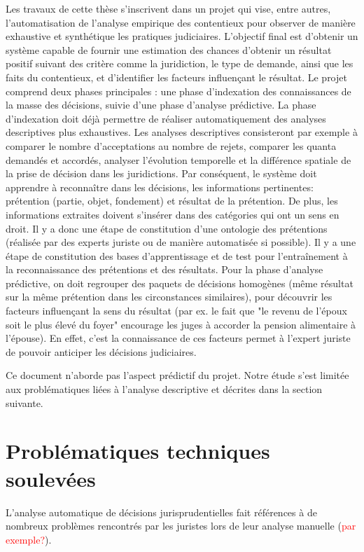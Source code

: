 Les travaux de cette thèse s'inscrivent dans un projet qui vise, entre autres, l'automatisation de l'analyse empirique des contentieux pour observer de manière exhaustive et synthétique les pratiques judiciaires. L'objectif final est d'obtenir un système capable de fournir une estimation des chances d'obtenir un résultat positif suivant des critère comme la juridiction, le type de demande, ainsi que les faits du contentieux, et d'identifier les facteurs influençant le résultat. Le projet comprend deux phases principales : une phase d'indexation des connaissances de la masse des décisions, suivie d'une phase d'analyse prédictive. La phase d'indexation doit déjà permettre de réaliser automatiquement des analyses descriptives plus exhaustives. Les analyses descriptives consisteront par exemple à comparer le nombre d'acceptations au nombre de rejets, comparer les quanta demandés et accordés, analyser l'évolution temporelle et la différence spatiale de la prise de décision dans les juridictions. Par conséquent, le système doit apprendre à reconnaître dans les décisions, les informations pertinentes: prétention (partie, objet, fondement) et résultat de la prétention. De plus, les informations extraites doivent s'insérer dans des catégories qui ont un sens en droit. Il y a donc une étape de constitution d'une ontologie des prétentions (réalisée par des experts juriste ou de manière automatisée si possible). Il y a une étape de constitution des bases d'apprentissage et de test pour l'entraînement à la reconnaissance des prétentions et des résultats.
Pour la phase d'analyse prédictive, on doit regrouper des paquets de décisions homogènes (même résultat sur la même prétention dans les circonstances similaires), pour découvrir les facteurs influençant la sens du résultat (par ex. le fait que "le revenu de l'époux soit le plus élevé du foyer" encourage les juges à accorder la pension alimentaire à l'épouse). En effet, c'est la connaissance de ces facteurs permet à l'expert juriste de pouvoir anticiper les décisions judiciaires.

Ce document n'aborde pas l'aspect prédictif du projet. Notre étude s'est limitée aux problématiques liées à l'analyse descriptive et décrites dans la section suivante.

\section{Problématiques techniques soulevées}
\label{sec:intro:probleme}
L'analyse automatique de décisions jurisprudentielles fait références à de nombreux problèmes rencontrés par les juristes lors de leur analyse manuelle (\textcolor{red}{par exemple?}). 

